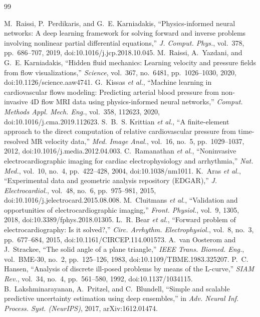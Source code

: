 \documentclass[journal]{IEEEtran}
\begin{document}
\begin{thebibliography}{99}
\itemsep 1pt

 M.~Raissi, P.~Perdikaris, and G.~E. Karniadakis, ``Physics-informed neural
networks: A deep learning framework for solving forward and inverse problems involving nonlinear
partial differential equations,'' \emph{J. Comput. Phys.}, vol.~378, pp.~686--707, 2019,
doi:10.1016/j.jcp.2018.10.045.
 M.~Raissi, A.~Yazdani, and G.~E. Karniadakis, ``Hidden fluid mechanics:
Learning velocity and pressure fields from flow visualizations,'' \emph{Science}, vol.~367,
no.~6481, pp.~1026--1030, 2020, doi:10.1126/science.aaw4741.
 G.~Kissas \emph{et al.}, ``Machine learning in cardiovascular flows modeling:
Predicting arterial blood pressure from non-invasive 4D flow MRI data using physics-informed
neural networks,'' \emph{Comput. Methods Appl. Mech. Eng.}, vol.~358, 112623, 2020,
doi:10.1016/j.cma.2019.112623.
 S.~B.~S. Krittian \emph{et al.}, ``A finite-element approach to the direct
computation of relative cardiovascular pressure from time-resolved MR velocity data,'' \emph{Med.
Image Anal.}, vol.~16, no.~5, pp.~1029--1037, 2012, doi:10.1016/j.media.2012.04.003.
 C.~Ramanathan \emph{et al.}, ``Noninvasive electrocardiographic imaging
for cardiac electrophysiology and arrhythmia,'' \emph{Nat. Med.}, vol.~10, no.~4, pp.~422--428,
2004, doi:10.1038/nm1011.
 K.~Aras \emph{et al.}, ``Experimental data and geometric analysis repository
(EDGAR),'' \emph{J. Electrocardiol.}, vol.~48, no.~6, pp.~975--981, 2015,
doi:10.1016/j.jelectrocard.2015.08.008.
 M.~Cluitmans \emph{et al.}, ``Validation and opportunities of
electrocardiographic imaging,'' \emph{Front. Physiol.}, vol.~9, 1305, 2018,
doi:10.3389/fphys.2018.01305.
 L.~R. Bear \emph{et al.}, ``Forward problem of electrocardiography: Is it
solved?,'' \emph{Circ. Arrhythm. Electrophysiol.}, vol.~8, no.~3, pp.~677--684, 2015,
doi:10.1161/CIRCEP.114.001573.
 A.~van Oosterom and J.~Strackee, ``The solid angle of a plane triangle,''
\emph{IEEE Trans. Biomed. Eng.}, vol.~BME-30, no.~2, pp.~125--126, 1983,
doi:10.1109/TBME.1983.325207.
 P.~C. Hansen, ``Analysis of discrete ill-posed problems by means of the
L-curve,'' \emph{SIAM Rev.}, vol.~34, no.~4, pp.~561--580, 1992, doi:10.1137/1034115.
 B.~Lakshminarayanan, A.~Pritzel, and C.~Blundell, ``Simple and
scalable predictive uncertainty estimation using deep ensembles,'' in \emph{Adv. Neural Inf.
Process. Syst. (NeurIPS)}, 2017, arXiv:1612.01474.

\end{thebibliography}
\end{document}
